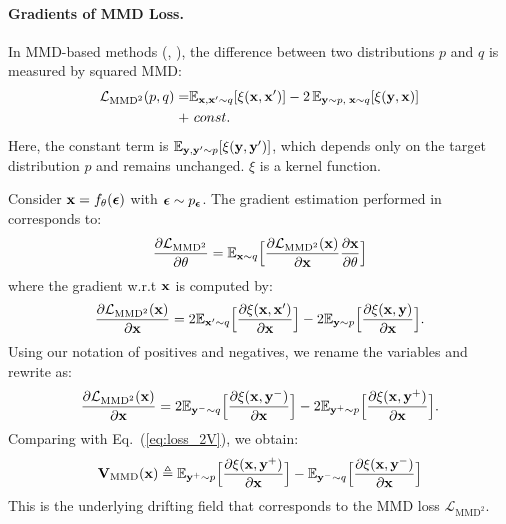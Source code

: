 \paragraph{Gradients of MMD Loss.}
\newcommand{\kk}{\xi}
\newcommand{\LMMD}{\mathcal{L}_{\text{MMD}^2}}
In MMD-based methods (\eg, \citealt{li2015generative}), the difference between two distributions $p$ and $q$ is measured by squared MMD:
\begin{equation}
\label{eq:mmd2_def}
\begin{aligned}
\LMMD(p,q)
= &
\mathbb{E}_{\x,\x'\sim q}[\kk(\x,\x')]
-2\,\mathbb{E}_{\y\sim p,\;\x\sim q}[\kk(\y,\x)]
\\
+ &~const.
\end{aligned}
\end{equation}
Here, the constant term is $\mathbb{E}_{\y,\y'\sim p}[\kk(\y,\y')]$, which depends only on the target distribution $p$ and remains unchanged. $\kk$ is a kernel function. 

Consider $\mathbf{x}=f_\theta({\boldsymbol{\epsilon}})$ with ${\boldsymbol{\epsilon}}\sim p_{\boldsymbol{\epsilon}}$. The gradient estimation performed in \cite{li2015generative} corresponds to:
\begin{equation}
\frac{\partial\LMMD}{\partial {\theta}} =
\mathbb{E}_{\x{\sim}q}\Big[\frac{\partial\LMMD(\x)}{\partial {\x}} \frac{\partial\x}{\partial\theta}
\Big]
\end{equation}
where the gradient w.r.t $\mathbf{x}$ is computed by:
\begin{equation}
\frac{\partial\LMMD(\x)}{\partial {\x}}
=
2\mathbb{E}_{\x'{\sim}q} \Big[\frac{\partial \kk(\x,\x')}{\partial{\x}}\Big]
-
2\mathbb{E}_{\y{\sim}p} \Big[\frac{\partial \kk(\x,\y)}{\partial{\x}}\Big].
\end{equation}
Using our notation of positives and negatives, we rename the variables and rewrite as:
\begin{equation}
\label{eq:mmd_eq4}
\frac{\partial\mathcal L_{\text{MMD}^2}(\x)}{\partial {\x}}
=
2\mathbb{E}_{\yn{\sim}q} \Big[\frac{\partial \kk(\x,\yn)}{\partial{\x}}\Big]
-
2\mathbb{E}_{\yp{\sim}p} \Big[\frac{\partial \kk(\x,\yp)}{\partial{\x}}\Big].
\end{equation}
Comparing with Eq.~(\ref{eq:loss_2V}), we obtain:
\begin{equation}
\label{eq:mmd_Vmmd}
\V_\text{MMD}(\x)
\triangleq
\mathbb{E}_{\yp{\sim}p} \Big[\frac{\partial \kk(\x,\yp)}{\partial{\x}}\Big]
-
\mathbb{E}_{\yn{\sim}q} \Big[\frac{\partial \kk(\x,\yn)}{\partial{\x}}\Big]
\end{equation}
This is the underlying drifting field that corresponds to the MMD loss $\LMMD$.




